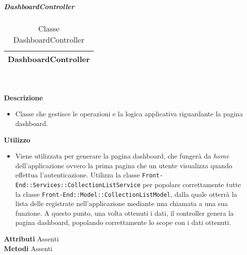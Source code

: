 			\subparagraph{DashboardController} 
\begin{table}[ht]
\begin{center}
\bgroup
	\setlength{\arrayrulewidth}{0.6mm}
	\def\arraystretch{1}
		\begin{tabular}{ | p{12cm} | }
				\hline  
					\centerline{\textbf{DashboardController}}
		\\ \hline 
				\hline
				\hline
		
		\end{tabular}
\egroup
\caption{Classe DashboardController}
\end{center}
\end{table} \textbf{\\ \\ Descrizione}
\begin{itemize}
\item[] Classe che gestisce le operazioni e la logica applicativa riguardante la pagina dashboard.
\end{itemize} 
\textbf{Utilizzo}
\begin{itemize}
\item[] Viene utilizzata per generare la pagina dashboard, che fungerà da \textit{home} dell'applicazione ovvero la prima pagina che un utente visualizza quando effettua l'autenticazione. Utilizza la classe \texttt{Front-End::Services::CollectionListService} per popolare correttamente tutte la classe \texttt{Front-End::Model::CollectionListModel}, dalla quale otterrà la lista delle  registrate nell'applicazione mediante una chiamata a una sua funzione. A questo punto, una volta ottenuti i dati, il controller genera la pagina dashboard, popolando correttamente lo scope con i dati ottenuti.
\end{itemize}
\textbf{Attributi}
Assenti \\
\textbf{Metodi}
Assenti \\


